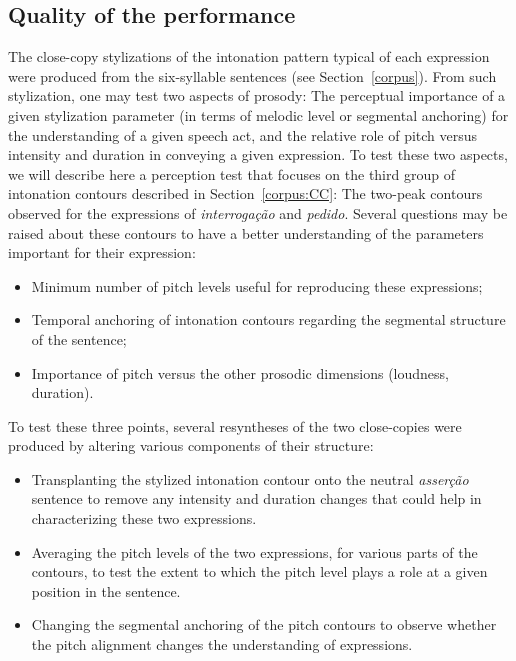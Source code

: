 \documentclass[output=paper]{LSP/langsci}
\begin{document}
\subsection{Quality of the performance}
\label{perception:performance}

The close-copy stylizations of the intonation pattern typical of each expression were produced from the six-syllable sentences (see Section~\ref{corpus}). 
From such stylization, one may test two aspects of prosody: The perceptual importance of a given stylization parameter (in terms of melodic level or segmental anchoring) for the understanding of a given speech act, and the relative role of pitch versus intensity and duration in conveying a given expression. 
To test these two aspects, we will describe here a perception test that focuses on the third group of intonation contours described in Section~\ref{corpus:CC}: The two-peak contours observed for the expressions of \textit{interrogação} and \textit{pedido}. 
Several questions may be raised about these contours to have a better understanding of the parameters important for their expression:
\begin{itemize}
\item Minimum number of pitch levels useful for reproducing these expressions;
\item Temporal anchoring of intonation contours regarding the segmental structure of the sentence;
\item Importance of pitch versus the other prosodic dimensions (loudness, duration).
\end{itemize}

To test these three points, several resyntheses of the two close-copies were produced by altering various components of their structure:
\begin{itemize}
\item Transplanting the stylized intonation contour onto the neutral \textit{asserção} sentence to remove any intensity and duration changes that could help in characterizing these two expressions.
\item Averaging the pitch levels of the two expressions, for various parts of the contours, to test the extent to which the pitch level plays a role at a given position in the sentence.
\item Changing the segmental anchoring of the pitch contours to observe whether the pitch alignment changes the understanding of expressions.
\end{itemize}
\end{document}
